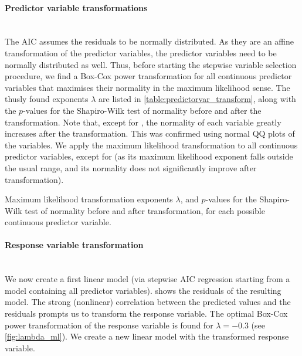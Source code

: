 \documentclass[a4paper, 12pt]{article}
\newcommand{\varr}[1]{\texttt{\StrSubstitute{#1}{ }{\_\allowbreak}}}
\begin{document}
\paragraph{Predictor variable transformations}
\label{sec:var_transform}\leavevmode\\
The AIC assumes the residuals to be normally distributed. As they are an affine transformation of the predictor variables, the predictor variables need to be normally distributed as well. Thus, before starting the stepwise variable selection procedure, we find a Box-Cox power transformation \cite{boxcox} for all continuous predictor variables that maximises their normality in the maximum likelihood sense. The thusly found exponents $\lambda$ are listed in \cref{table:predictorvar_transform}, along with the $p$-values for the Shapiro-Wilk test of normality before and after the transformation. Note that, except for \varr{noise level}, the normality of each variable greatly increases after the transformation. This was confirmed using normal QQ plots of the variables. We apply the maximum likelihood transformation to all continuous predictor variables, except for \varr{noise level} (as its maximum likelihood exponent falls outside the usual range, and its normality does not significantly improve after transformation).

\begin{table}
\centering

\caption{Maximum likelihood transformation exponents $\lambda$, and $p$-values for the Shapiro-Wilk test of normality before and after transformation, for each possible continuous predictor variable.}
\label{table:predictorvar_transform}
\end{table}

\paragraph{Response variable transformation}
\label{sec:responsevar_transfrom}\leavevmode\\
We now create a first linear model (via stepwise AIC regression starting from a model containing all predictor variables).  shows the residuals of the resulting model. The strong (nonlinear) correlation between the predicted \varr{co2} values and the residuals prompts us to transform the response variable. The optimal Box-Cox power transformation of the response variable \cite{boxcox} is found for $\lambda = -0.3$ (see \cref{fig:lambda_ml}). We create a new linear model with the transformed response variable.
\end{document}

